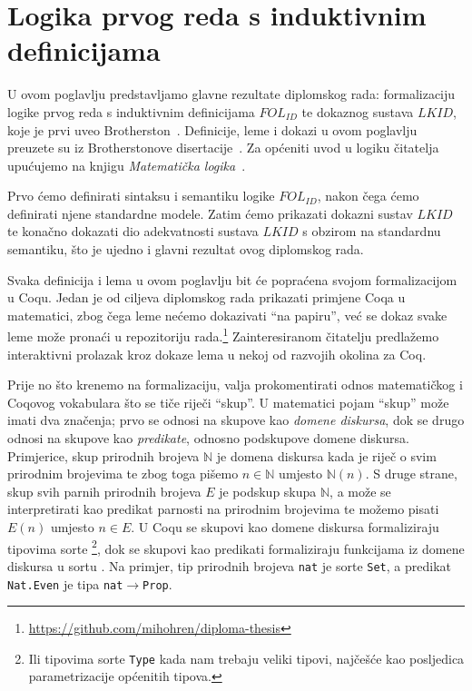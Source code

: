 \chapter{Logika prvog reda s induktivnim definicijama}\label{cha:logika-prvog-reda}
U ovom poglavlju predstavljamo glavne rezultate diplomskog rada: formalizaciju
logike prvog reda s induktivnim definicijama \(\mathit{FOL_{ID}}\)
te dokaznog sustava \(\mathit{LKID}\), koje je prvi uveo Brotherston~\cite{brotherston2005}.
Definicije, leme i dokazi u ovom poglavlju preuzete su iz Brotherstonove disertacije~\cite{brotherstonphd}.
Za općeniti uvod u logiku čitatelja upućujemo na knjigu \textit{Matematička logika}~\cite{vukovic}.

Prvo ćemo definirati sintaksu i semantiku logike \(\mathit{FOL_{ID}}\),
nakon čega ćemo definirati njene standardne modele.
Zatim ćemo prikazati dokazni sustav \(\mathit{LKID}\) te konačno dokazati dio adekvatnosti
sustava \(LKID\) s obzirom na standardnu semantiku,
što je ujedno i glavni rezultat ovog diplomskog rada.

Svaka definicija i lema u ovom poglavlju bit će popraćena svojom formalizacijom u Coqu.
Jedan je od ciljeva diplomskog rada prikazati primjene Coqa u matematici,
zbog čega leme nećemo dokazivati \enquote{na papiru},
već se dokaz svake leme može pronaći u repozitoriju rada.\footnote{\url{https://github.com/mihohren/diploma-thesis}}
Zainteresiranom čitatelju predlažemo interaktivni prolazak
kroz dokaze lema u nekoj od razvojih okolina za Coq.

Prije no što krenemo na formalizaciju, valja prokomentirati odnos matematičkog i Coqovog vokabulara
što se tiče riječi \enquote{skup}.
U matematici pojam \enquote{skup} može imati dva značenja;
prvo se odnosi na skupove kao \textit{domene diskursa},
dok se drugo odnosi na skupove kao \textit{predikate}, odnosno podskupove domene diskursa.
Primjerice, skup prirodnih brojeva \(\mathbb{N}\) je domena diskursa kada je riječ o svim prirodnim brojevima
te zbog toga pišemo \(n \in \mathbb{N}\) umjesto \(\mathbb{N}(n)\).
S druge strane, skup svih parnih prirodnih brojeva \(E\) je podskup skupa \(\mathbb{N}\), a može se interpretirati
kao predikat parnosti na prirodnim brojevima te možemo pisati \(E(n)\) umjesto \(n \in E\).
U Coqu se skupovi kao domene diskursa formaliziraju tipovima sorte \coqset\footnote{Ili tipovima sorte \texttt{Type}
kada nam trebaju veliki tipovi, najčešće kao posljedica parametrizacije općenitih tipova.},
dok se skupovi kao predikati formaliziraju funkcijama iz domene diskursa u sortu \coqprop.
Na primjer, tip prirodnih brojeva \texttt{nat} je sorte \texttt{Set}, a predikat \texttt{Nat.Even} je tipa \texttt{nat\(\rightarrow\)Prop}.

